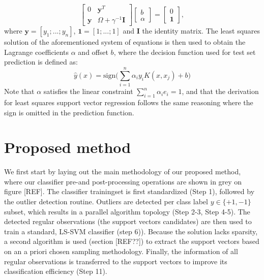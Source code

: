 \documentclass[preprint,12pt]{elsarticle}
\begin{document}
	\begin{equation}
	\begin{bmatrix}
	0 & \mathbf{y} ^T \\
	\mathbf{y} & \Omega + \gamma^{-1} \mathbf{I}
	\end{bmatrix}	
	\begin{bmatrix}
	b \\
	\alpha
	\end{bmatrix}
	=
	\begin{bmatrix}
	0 \\
	\mathbf{1}
	\end{bmatrix},
	\end{equation}
	where $\mathbf{y}  = [y_1;...;y_n]$, $\mathbf{1} = [1;...;1]$ and $\mathbf{I}$ the identity matrix.
	The least squares solution of the aforementioned system of equations is then used to  obtain the Lagrange coefficients $\alpha$ and offset $b$, where the decision function used for test set prediction is defined as:
	\begin{equation}
	\hat{y}(x) = \mathrm{sign}\Big(\sum_{i=1}^{n} \alpha_i y_i K(x, x_j) + b\Big)	
	\label{eq:classification}
	\end{equation}
Note that $\alpha$ satisfies the linear constraint $\sum_{i=1}^{n} \alpha_i  e_i = 1$, and that the derivation for least squares support vector regression follows the same reasoning where the sign is omitted in the prediction function. %
	
	\newpage
	
	\section{Proposed method}
	\label{sec:proposed}
	We first start by laying out the main methodology of our proposed method, where our classifier pre-and post-processing operations are shown in grey on figure [REF]. The classifier trainingset is first standardized (Step 1), followed by the outlier detection routine. Outliers are detected per class label $y \in \{+1, -1\}$ subset, which results in a parallel algorithm topology (Step 2-3, Step 4-5).
	 The detected regular observations (the support vectors candidates) are then used to train a standard, LS-SVM classifier (step 6)). Because the solution lacks sparsity, a second algorithm is used (section [REF??]) to extract the support vectors based on an a priori chosen sampling methodology. Finally, the information of all regular observations is transferred to the support vectors to improve its classification efficiency (Step 11). \\
	
\end{document}
